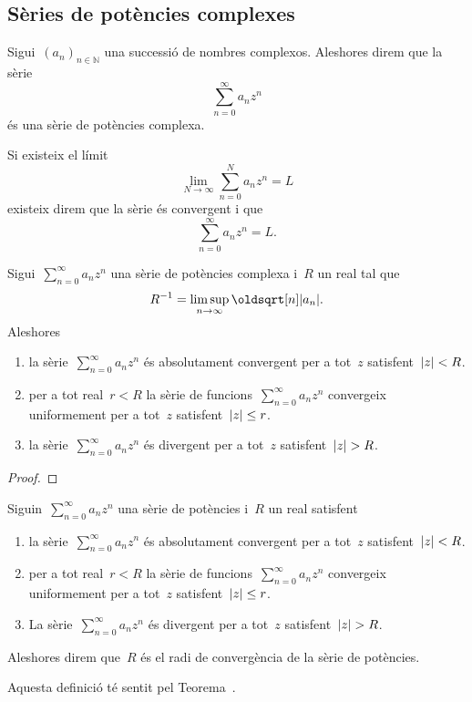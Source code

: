 \documentclass[../Apunts.tex]{subfiles}
\begin{document}
	\subsection{Sèries de potències complexes}
	\begin{definition}
		\label{def:sèrie de potències complexes}
		Sigui~\((a_{n})_{n\in\mathbb{N}}\) una successió de nombres complexos. Aleshores direm que la sèrie
		\[\sum_{n=0}^{\infty}a_{n}z^{n}\]
		és una sèrie de potències complexa.
		
		Si existeix el límit
		\[\lim_{N\to\infty}\sum_{n=0}^{N}a_{n}z^{n}=L\]
		existeix direm que la sèrie és convergent i que
		\[\sum_{n=0}^{\infty}a_{n}z^{n}=L.\]
		
	\end{definition}
	\begin{theorem}
		\label{thm:radi de convergència d'una sèrie de potències complexa}
		Sigui~\(\sum_{n=0}^{\infty}a_{n}z^{n}\) una sèrie de potències complexa i~\(R\) un real tal que
		\[R^{-1}=\limsup_{n\to\infty}\sqrt[n]{\modul{a_{n}}}.\]
		Aleshores
		\begin{enumerate}
			\item\label{thm:radi de convergència d'una sèrie de potències complexa:enum1} la sèrie~\(\sum_{n=0}^{\infty}a_{n}z^{n}\) és absolutament convergent per a tot~\(z\) satisfent~\(\modul{z}<R\).
			\item\label{thm:radi de convergència d'una sèrie de potències complexa:enum2} per a tot real~\(r<R\) la sèrie de funcions~\(\sum_{n=0}^{\infty}a_{n}z^{n}\) convergeix uniformement per a tot~\(z\) satisfent~\(\modul{z}\leq r\).
			\item\label{thm:radi de convergència d'una sèrie de potències complexa:enum3} la sèrie~\(\sum_{n=0}^{\infty}a_{n}z^{n}\) és divergent per a tot~\(z\) satisfent~\(\modul{z}>R\).
		\end{enumerate}
	\end{theorem}
	\begin{proof}
	\end{proof}
	\begin{definition}[Radi de convergència]
		Siguin~\(\sum_{n=0}^{\infty}a_{n}z^{n}\) una sèrie de potències i~\(R\) un real satisfent
		\begin{enumerate}
			\item la sèrie~\(\sum_{n=0}^{\infty}a_{n}z^{n}\) és absolutament convergent per a tot~\(z\) satisfent~\(\modul{z}<R\).
			\item per a tot real~\(r<R\) la sèrie de funcions~\(\sum_{n=0}^{\infty}a_{n}z^{n}\) convergeix uniformement per a tot~\(z\) satisfent~\(\modul{z}\leq r\).
			\item La sèrie~\(\sum_{n=0}^{\infty}a_{n}z^{n}\) és divergent per a tot~\(z\) satisfent~\(\modul{z}>R\).
		\end{enumerate}
		Aleshores direm que~\(R\) és el radi de convergència de la sèrie de potències.
		
		Aquesta definició té sentit pel Teorema~.
	\end{definition}
\end{document}
